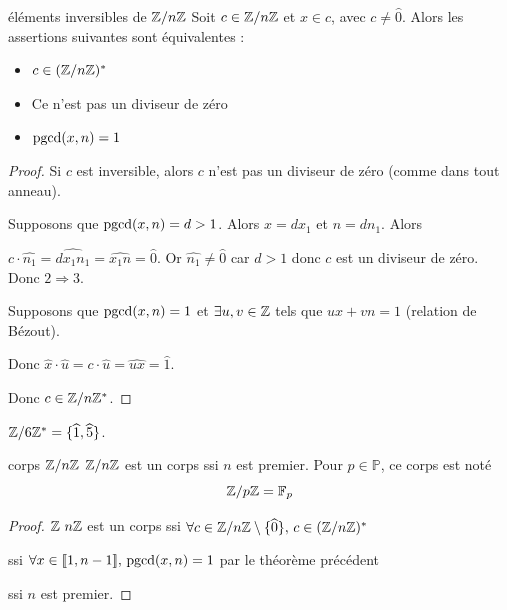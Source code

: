 \begin{theoreme}{éléments inversibles de $\mathbb{Z} / n \mathbb{Z}$}{}
    Soit $c \in \mathbb{Z}/n \mathbb{Z}$ et $x \in c$, avec $c \neq \hat 0$. 
    Alors les assertions suivantes sont équivalentes : 
    
    \begin{itemize}
        \item $c \in (\mathbb{Z} / n \mathbb{Z})^*$
        \item Ce n'est pas un diviseur de zéro
        \item $\operatorname{pgcd}(x, n) = 1$ 
    \end{itemize}
\end{theoreme}


\begin{proof}
    Si $c$ est inversible, alors $c$ n'est pas un diviseur de zéro (comme dans tout anneau).

    Supposons que $\operatorname{pgcd}(x, n) = d > 1$. Alors $x = d x_1$ et $n = d n_1$. Alors 

    $c \cdot \widehat{n_1} = \widehat{dx_1n_1} = \widehat{x_1n} = \widehat{0}$. 
    Or $\widehat {n_1} \neq \widehat{0}$ car $d > 1$ donc $c$ est un diviseur de zéro.
    Donc $2 \Rightarrow 3$.

    \avspace Supposons que $\operatorname{pgcd}(x, n) = 1$ et $\exists u, v \in \mathbb{Z}$ tels que $ux + vn = 1$ (relation de Bézout).

    Donc $\widehat x \cdot \widehat u = c \cdot \widehat u = \widehat{ux} = \widehat{1}$.

    Donc $c \in \mathbb{Z}/n\mathbb{Z}^*$.
\end{proof}

\begin{exemple}
    $\mathbb{Z}/6\mathbb{Z}^* = \{\widehat{1}, \widehat{5}\}$.
\end{exemple}

\begin{theoreme}{corps $\mathbb{Z}/n\mathbb{Z}$}{}
    $\mathbb{Z}/n\mathbb{Z}$ est un corps ssi $n$ est premier. Pour $p \in \mathbb{P}$, ce corps est noté 
    $$\mathbb{Z}/p\mathbb{Z} = \mathbb{F}_p$$
\end{theoreme}

\begin{proof}
    $\mathbb{Z} \ n \mathbb{Z}$ est un corps ssi $\forall c \in \mathbb{Z} / n \mathbb{Z} \setminus \{\widehat{0}\}, \, c \in (\mathbb{Z} / n \mathbb{Z})^*$

    ssi $\forall x \in [\![1, n - 1]\!], \, \operatorname{pgcd}(x, n) = 1$ par le théorème précédent

    ssi $n$ est premier.
\end{proof}

